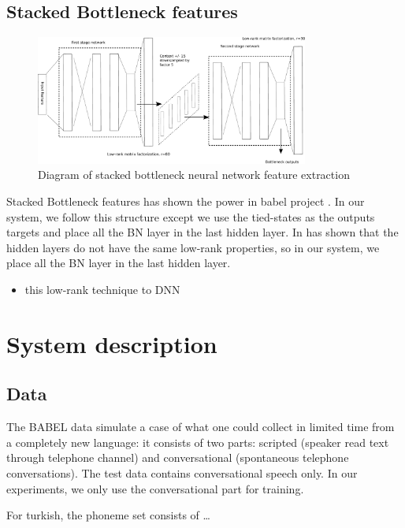 \documentclass{article}
\begin{document}
\subsection{Stacked Bottleneck features}
\begin{figure}[htb]
  \centering
  \centerline{\includegraphics[width=0.8\textwidth]{stackNN.eps}}
  \caption{Diagram of stacked bottleneck neural network feature extraction}
  \label{ref:stackDNN}
\end{figure}

Stacked Bottleneck features has shown the power in babel project \cite{Martin2013}. In our system, we follow this structure except we use the tied-states as the outputs targets and place all the BN layer in the last hidden layer. In \cite{Tara2013} has shown that the hidden layers do not have the same low-rank properties, so in our system, we place all the BN layer in the last hidden layer.



\begin{itemize}
  \item this low-rank technique to DNN 
\end{itemize}

\section{System description}
\subsection{Data}
The BABEL data simulate a case of what one could collect in limited time from a completely new language: it consists of two parts: scripted (speaker read text through telephone channel) and conversational (spontaneous telephone conversations). The test data contains conversational speech only. In our experiments, we only use the conversational part for training.

For turkish, the phoneme set consists of \dots
\end{document}
